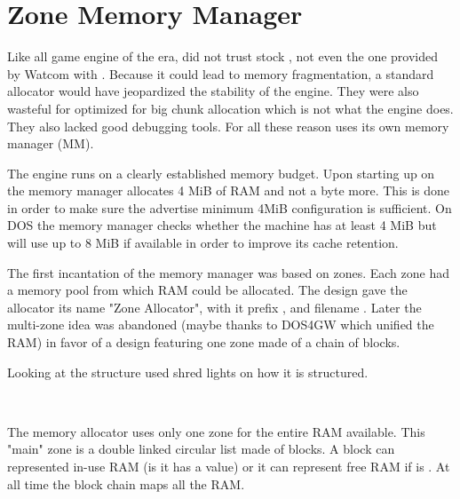 \section{Zone Memory Manager}
Like all game engine of the era, \doom did not trust stock , not even the one provided by Watcom with . Because it could lead to memory fragmentation, a standard allocator would have jeopardized the stability of the engine. They were also wasteful for optimized for big chunk allocation which is not what the engine does. They also lacked good debugging tools. For all these reason \doom uses its own memory manager (MM).\\
\par

The engine runs on a clearly established memory budget. Upon starting up on \NeXT the memory manager allocates 4 MiB of RAM and not a byte more. This is done in order to make sure the advertise minimum 4MiB configuration is sufficient. On DOS the memory manager checks whether the machine has at least 4 MiB but will use up to 8 MiB if available in order to improve its cache retention.\\
\par
The first incantation of the memory manager was based on zones. Each zone had a memory pool from which RAM could be allocated. The design gave the allocator its name "Zone Allocator", with it prefix , and filename . Later the multi-zone idea was abandoned (maybe thanks to DOS4GW which unified the RAM) in favor of a design featuring one zone made of a chain of blocks.\\
\par
Looking at the structure used shred lights on how it is structured.\\
\par
{}\\
\par
The memory allocator uses only one zone for the entire RAM available. This "main" zone is a double linked circular list made of blocks. A block can represented in-use RAM (is it has a  value) or it can represent free RAM if  is . At all time the block chain maps all the RAM.\\
\par



